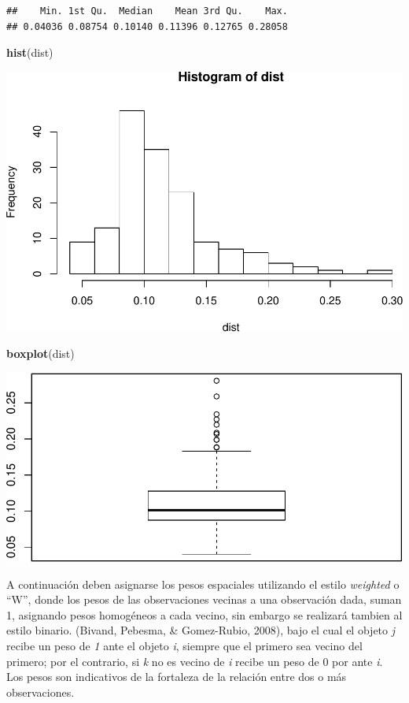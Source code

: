 \documentclass[11pt,]{article}
\newenvironment{Shaded}{\begin{snugshade}}{\end{snugshade}}
\newcommand{\KeywordTok}[1]{\textcolor[rgb]{0.13,0.29,0.53}{\textbf{#1}}}
\newcommand{\NormalTok}[1]{#1}
\begin{document}
\begin{verbatim}
##    Min. 1st Qu.  Median    Mean 3rd Qu.    Max. 
## 0.04036 0.08754 0.10140 0.11396 0.12765 0.28058
\end{verbatim}

\begin{Shaded}
\begin{Highlighting}[]
\KeywordTok{hist}\NormalTok{(dist)}
\end{Highlighting}
\end{Shaded}

\includegraphics{proyecto_files/figure-latex/unnamed-chunk-14-1.pdf}

\begin{Shaded}
\begin{Highlighting}[]
\KeywordTok{boxplot}\NormalTok{(dist)}
\end{Highlighting}
\end{Shaded}

\includegraphics{proyecto_files/figure-latex/unnamed-chunk-14-2.pdf}

A continuación deben asignarse los pesos espaciales utilizando el estilo
\emph{weighted} o ``W'', donde los pesos de las observaciones vecinas a
una observación dada, suman 1, asignando pesos homogéneos a cada vecino,
sin embargo se realizará tambien al estilo binario. (Bivand, Pebesma, \&
Gomez-Rubio, 2008), bajo el cual el objeto \emph{j} recibe un peso de
\emph{1} ante el objeto \emph{i}, siempre que el primero sea vecino del
primero; por el contrario, si \emph{k} no es vecino de \emph{i} recibe
un peso de 0 por ante \emph{i}. Los pesos son indicativos de la
fortaleza de la relación entre dos o más observaciones.
\end{document}
